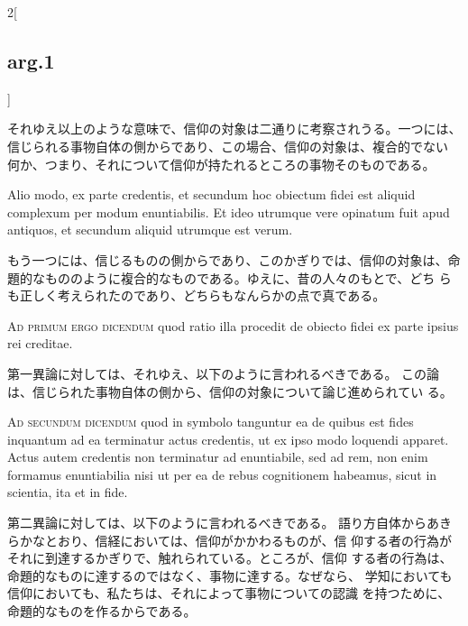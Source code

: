 \documentclass[paper=a4paper,fontsize=10pt,jafontsize=9pt,titlepage]{jlreq}
\begin{document}
\begin{paracol}{2}[\subsection{arg.1}]
\switchcolumn

それゆえ以上のような意味で、信仰の対象は二通りに考察されうる。一つには、
 信じられる事物自体の側からであり、この場合、信仰の対象は、複合的でない
 何か、つまり、それについて信仰が持たれるところの事物そのものである。

\switchcolumn*

Alio modo, ex parte
credentis, et secundum hoc obiectum fidei est aliquid complexum per
modum enuntiabilis. Et ideo utrumque vere opinatum fuit apud antiquos,
et secundum aliquid utrumque est verum.

\switchcolumn

もう一つには、信じるものの側からであり、このかぎりでは、信仰の対象は、命
 題的なもののように複合的なものである。ゆえに、昔の人々のもとで、どち
 らも正しく考えられたのであり、どちらもなんらかの点で真である。

\switchcolumn*[\subsection{ad.1}]

{\scshape Ad primum ergo dicendum} quod ratio illa
procedit de obiecto fidei ex parte ipsius rei creditae.

\switchcolumn

第一異論に対しては、それゆえ、以下のように言われるべきである。
この論は、信じられた事物自体の側から、信仰の対象について論じ進められてい
 る。

\switchcolumn*[\subsection{ad.2}]

{\scshape Ad secundum dicendum} quod in symbolo
tanguntur ea de quibus est fides inquantum ad ea terminatur actus
credentis, ut ex ipso modo loquendi apparet. Actus autem credentis non
terminatur ad enuntiabile, sed ad rem, non enim formamus enuntiabilia
nisi ut per ea de rebus cognitionem habeamus, sicut in scientia, ita et
in fide.

\switchcolumn

第二異論に対しては、以下のように言われるべきである。
語り方自体からあきらかなとおり、信経においては、信仰がかかわるものが、信
 仰する者の行為がそれに到達するかぎりで、触れられている。ところが、信仰
 する者の行為は、命題的なものに達するのではなく、事物に達する。なぜなら、
 学知においても信仰においても、私たちは、それによって事物についての認識
 を持つために、命題的なものを作るからである。


\end{paracol}
\end{document}
